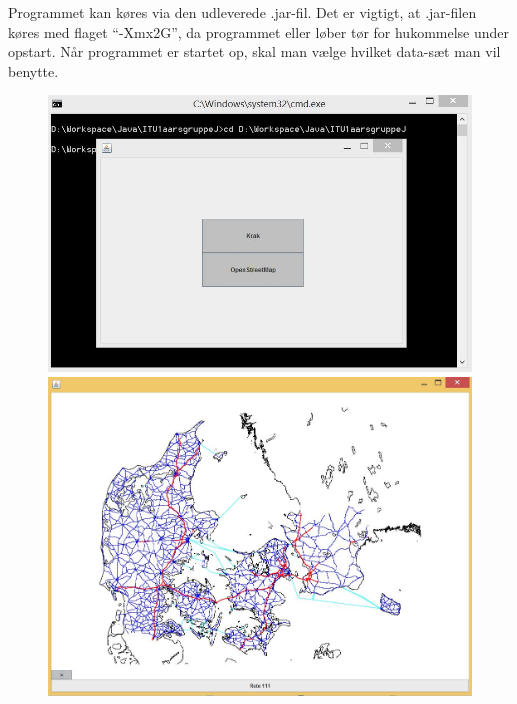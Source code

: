 Programmet kan køres via den udleverede .jar-fil. Det er vigtigt, at .jar-filen køres med flaget ``-Xmx2G'', da programmet eller løber tør for hukommelse under opstart. Når programmet er startet op, skal man vælge hvilket data-sæt man vil benytte.

\begin{figure}
\centering
\begin{minipage}{.5\textwidth}
  \centering
	\includegraphics[width=(0.95\textwidth)]{brugervejledning/vaelgdata}
  \end{minipage}%
\begin{minipage}{.5\textwidth}
  \centering
\includegraphics[width=(0.95\textwidth)]{brugervejledning/renkort}
\end{minipage}
\end{figure}


